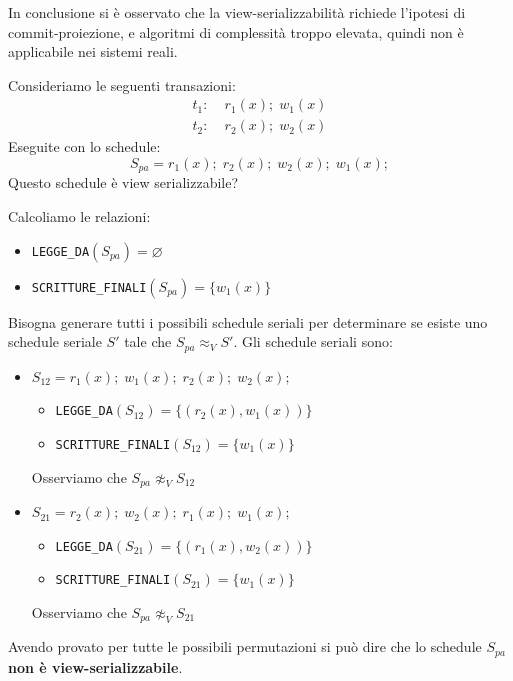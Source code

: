 \documentclass[a4paper]{article}
\begin{document}
\vspace{1em}
\noindent
In conclusione si è osservato che la view-serializzabilità richiede l'ipotesi di
commit-proiezione, e algoritmi di complessità troppo elevata, quindi non è applicabile
nei sistemi reali.

\begin{Example}{}{}
  Consideriamo le seguenti transazioni:
  \[
  \begin{aligned}
    t_1:\; & r_1(x); \; w_1(x) \\
    t_2:\; & r_2(x); \; w_2(x)
  \end{aligned}
  \]
  Eseguite con lo schedule:
  \[
    S_{pa} = r_1(x); \; r_2(x); \; w_2(x); \; w_1(x);
  \]
  Questo schedule è view serializzabile?

  \vspace{1em}
  \noindent
  Calcoliamo le relazioni:
  \begin{itemize}
    \item \texttt{LEGGE\_DA}\( (S_{pa}) = \varnothing \)
    \item \texttt{SCRITTURE\_FINALI}\( (S_{pa}) = \{ w_1(x) \} \)
  \end{itemize}

  \vspace{1em}
  \noindent
  Bisogna generare tutti i possibili schedule seriali per determinare se
  esiste uno schedule seriale \( S' \) tale che \( S_{pa} \approx_V S' \).
  Gli schedule seriali sono:
  \begin{itemize}
    \item \( S_{12} = r_1(x); \; w_1(x); \; r_2(x); \; w_2(x); \)
      \begin{itemize}
        \item \texttt{LEGGE\_DA}\( (S_{12}) = \{ (r_2(x), w_1(x)) \} \)
        \item \texttt{SCRITTURE\_FINALI}\( (S_{12}) = \{ w_1(x) \} \)
      \end{itemize}
      Osserviamo che \( S_{pa} \not\approx_V S_{12} \)

    \item \( S_{21} = r_2(x); \; w_2(x); \; r_1(x); \; w_1(x); \)
      \begin{itemize}
        \item \texttt{LEGGE\_DA}\( (S_{21}) = \{ (r_1(x), w_2(x)) \} \)
        \item \texttt{SCRITTURE\_FINALI}\( (S_{21}) = \{ w_1(x) \} \)
      \end{itemize}
      Osserviamo che \( S_{pa} \not\approx_V S_{21} \)
  \end{itemize}
  Avendo provato per tutte le possibili permutazioni si può dire che lo schedule
  \( S_{pa} \) \textbf{non è view-serializzabile}.
\end{Example}
\end{document}
